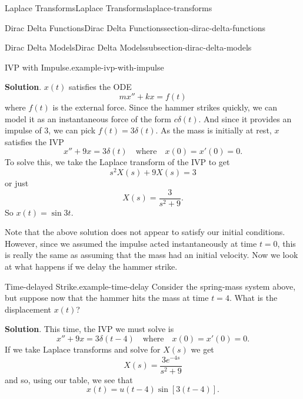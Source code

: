 \documentclass[oneside,10pt,]{book}
\numberwithin{equation}{section}
\newcommand{\qq}[1]{\quad\text{#1}\quad}
\begin{document}
\begin{chapterptx}{Laplace Transforms}{}{Laplace Transforms}{}{}{laplace-transforms}
\begin{sectionptx}{Dirac Delta Functions}{}{Dirac Delta Functions}{}{}{section-dirac-delta-functions}
\begin{subsectionptx}{Dirac Delta Models}{}{Dirac Delta Models}{}{}{subsection-dirac-delta-models}
\begin{example}{IVP with Impulse.}{example-ivp-with-impulse}
\par\smallskip%
\noindent\textbf{Solution}.\hypertarget{solution-87}{}\quad%
\hypertarget{p-547}{}%
\(x(t)\) satisfies the ODE%
\begin{equation*}
mx''+kx = f(t)
\end{equation*}
where \(f(t)\) is the external force. Since the hammer strikes quickly, we can model it as an instantaneous force of the form \(c\delta(t)\). And since it provides an impulse of \(3\), we can pick \(f(t) = 3\delta(t)\). As the mass is initially at rest, \(x\) satisfies the IVP%
\begin{equation*}
x''+9x = 3\delta(t)\qq{where}x(0) = x'(0) = 0.
\end{equation*}
To solve this, we take the Laplace transform of the IVP to get%
\begin{equation*}
s^{2}X(s)+9X(s) = 3
\end{equation*}
or just%
\begin{equation*}
X(s) = \frac{3}{s^{2}+9}.
\end{equation*}
So \(x(t) = \sin3t\).%
\end{example}
\hypertarget{p-548}{}%
Note that the above solution does not appear to satisfy our initial conditions. However, since we assumed the impulse acted instantaneously at time \(t=0\), this is really the same as assuming that the mass had an initial velocity. Now we look at what happens if we delay the hammer strike.%
\begin{example}{Time-delayed Strike.}{example-time-delay}%
\hypertarget{p-549}{}%
Consider the spring-mass system above, but suppose now that the hammer hits the mass at time \(t=4\). What is the displacement \(x(t)\)?%
\par\smallskip%
\noindent\textbf{Solution}.\hypertarget{solution-88}{}\quad%
\hypertarget{p-550}{}%
This time, the IVP we must solve is%
\begin{equation*}
x''+9x = 3\delta(t-4)\qq{where}x(0)=x'(0)=0.
\end{equation*}
If we take Laplace transforms and solve for \(X(s)\) we get%
\begin{equation*}
X(s) = \frac{3e^{-4s}}{s^{2}+9}
\end{equation*}
and so, using our table, we see that%
\begin{equation*}
x(t) = u(t-4)\sin[3(t-4)].
\end{equation*}
%
\end{example}
\begin{figure}
\centering
{
\begin{tikzpicture}[scale=0.7]

\end{tikzpicture}}
\end{figure}
\end{subsectionptx}
\end{sectionptx}
\end{chapterptx}
\end{document}
